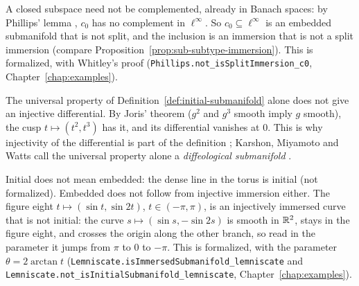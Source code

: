 \begin{remark}
  \label{rem:sub-immersion-vs-split}
  A closed subspace need not be complemented, already in Banach spaces: by Phillips' lemma
  \cite{Phi40}, $c_0$ has no complement in $\ell^\infty$. So $c_0 \subseteq \ell^\infty$ is an
  embedded submanifold that is not split, and the inclusion is an immersion that is not a split
  immersion (compare Proposition~\ref{prop:sub-subtype-immersion}). This is formalized, with
  Whitley's proof \cite{Whi66} (\texttt{Phillips.not\_isSplitImmersion\_c0},
  Chapter~\ref{chap:examples}).
\end{remark}

\begin{remark}
  \label{rem:sub-joris}
  The universal property of Definition~\ref{def:initial-submanifold} alone does not give an
  injective differential. By Joris' theorem \cite{Jor82} ($g^2$ and $g^3$ smooth imply $g$
  smooth), the cusp $t \mapsto (t^2, t^3)$ has it, and its differential vanishes at $0$. This is
  why injectivity of the differential is part of the definition \cite[p.~336]{GN26};
  Karshon, Miyamoto and Watts call the universal property alone a \emph{diffeological
  submanifold} \cite{KMW22}.
\end{remark}

\begin{remark}
  \label{rem:sub-initial-embedded}
  Initial does not mean embedded: the dense line in the torus is initial (not formalized).
  Embedded does not follow from injective immersion either. The figure eight
  $t \mapsto (\sin t, \sin 2t)$, $t \in (-\pi, \pi)$, is an injectively immersed curve that is
  not initial: the curve $s \mapsto (\sin s, -\sin 2s)$ is smooth in $\mathbb{R}^2$, stays in the figure
  eight, and crosses the origin along the other branch, so read in the parameter it jumps from
  $\pi$ to $0$ to $-\pi$. This is formalized, with the parameter $\theta = 2\arctan t$
  (\texttt{Lemniscate.isImmersedSubmanifold\_lemniscate} and
  \texttt{Lemniscate.not\_isInitialSubmanifold\_lemniscate}, Chapter~\ref{chap:examples}).
\end{remark}

